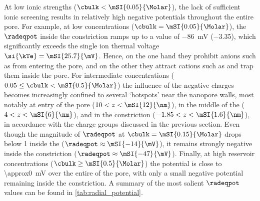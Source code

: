 At low ionic strengths ($\cbulk < \mSI{0.05}{\Molar}$), the lack of sufficient ionic screening results in
relatively high negative potentials throughout the entire pore. For example, at low concentrations ($\cbulk =
\mSI{0.05}{\Molar}$), the $\radeqpot$ inside the constriction ramps up to a value of \SI{-86}{\mV}
(\SI{-3.35}{\kTe}), which significantly exceeds the single ion thermal voltage $\si{\kTe} = \mSI{25.7}{\mV}$.
Hence, on the one hand they prohibit anions such as \Cl{} from entering the pore, and on the other they
attract cations such as \Na{} and trap them inside the pore. For intermediate concentrations ($0.05 \le \cbulk
< \mSI{0.5}{\Molar}$) the influence of the negative charges becomes increasingly confined to several
`hotspots' near the nanopore walls, most notably at entry of the pore ($10 < z < \mSI{12}{\nm}$), in the
middle of the \lumen{} ($4 < z < \mSI{6}{\nm}$), and in the constriction ($-1.85 < z < \mSI{1.6}{\nm}$), in
accordance with the charge groups discussed in the previous section. Even though the magnitude of $\radeqpot$
at $\cbulk = \mSI{0.15}{\Molar}$ drops below \SI{1}{\kTe} inside the \lumen{} ($\radeqpot \approx
\mSI{-14}{\mV}$), it remains strongly negative inside the constriction ($\radeqpot \approx \mSI{-47}{\mV}$).
Finally, at high reservoir concentrations ($\cbulk \ge \mSI{0.5}{\Molar}$) the potential is close to
\SI{\approx0}{\mV} over the entire \lumen{} of the pore, with only a small negative potential remaining inside
the constriction. A summary of the most salient $\radeqpot$ values can be found in
\cref{tab:radial_potential}.

